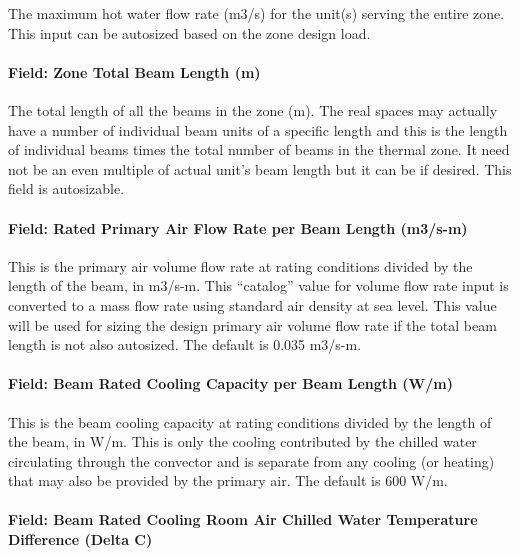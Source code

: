 The maximum hot water flow rate (m3/s) for the unit(s) serving the entire zone. This input can be autosized based on the zone design load.

\paragraph{Field: Zone Total Beam Length (m)}\label{field-zone-total-beam-length-m}

The total length of all the beams in the zone (m). The real spaces may actually have a number of individual beam units of a specific length and this is the length of individual beams times the total number of beams in the thermal zone. It need not be an even multiple of actual unit's beam length but it can be if desired. This field is autosizable.

\paragraph{Field: Rated Primary Air Flow Rate per Beam Length (m3/s-m)}\label{field-rated-primary-air-flow-rate-per-beam-length-m3s-m}

This is the primary air volume flow rate at rating conditions divided by the length of the beam, in m3/s-m. This ``catalog'' value for volume flow rate input is converted to a mass flow rate using standard air density at sea level. This value will be used for sizing the design primary air volume flow rate if the total beam length is not also autosized. The default is 0.035 m3/s-m.

\paragraph{Field: Beam Rated Cooling Capacity per Beam Length (W/m)}\label{field-beam-rated-cooling-capacity-per-beam-length-wm}

This is the beam cooling capacity at rating conditions divided by the length of the beam, in W/m. This is only the cooling contributed by the chilled water circulating through the convector and is separate from any cooling (or heating) that may also be provided by the primary air. The default is 600 W/m.

\paragraph{Field: Beam Rated Cooling Room Air Chilled Water Temperature Difference (Delta C)}\label{field-beam-rated-cooling-room-air-chilled-water-temperature-difference-delta-c}

